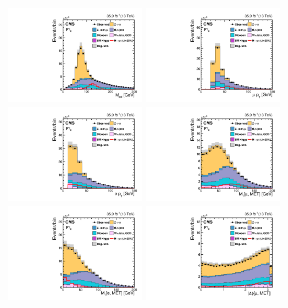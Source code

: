 \begin{figure}[!htpb]\centering
 \includegraphics[width=0.315\textwidth]{plots_and_figures/chapter5/preselection/Figure_002-a.pdf}
 \includegraphics[width=0.315\textwidth]{plots_and_figures/chapter5/preselection/Figure_002-b.pdf} \\
 \includegraphics[width=0.315\textwidth]{plots_and_figures/chapter5/preselection/Figure_002-c.pdf}
 \includegraphics[width=0.315\textwidth]{plots_and_figures/chapter5/preselection/Figure_002-d.pdf}  \\
 \includegraphics[width=0.315\textwidth]{plots_and_figures/chapter5/preselection/Figure_002-e.pdf}
 \includegraphics[width=0.315\textwidth]{plots_and_figures/chapter5/preselection/Figure_002-f.pdf} \\

\end{figure}

